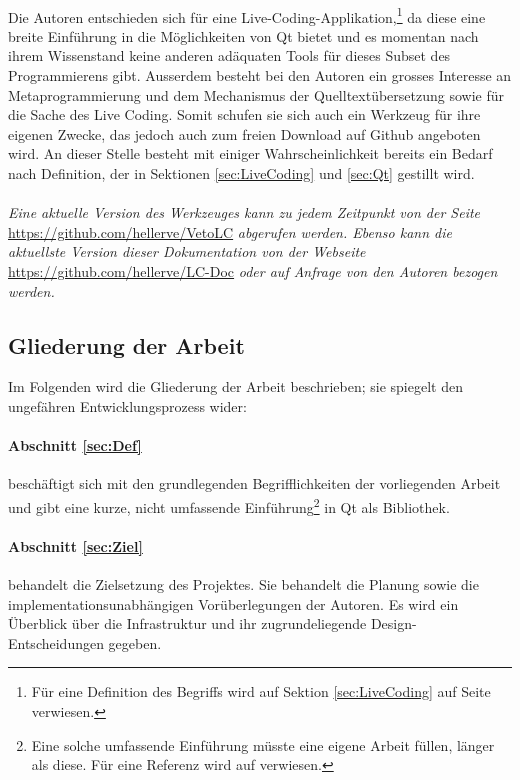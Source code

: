 \paragraph{}
	Die Autoren entschieden sich für eine Live-Coding-Applikation,\footnote{Für eine Definition des Begriffs wird auf Sektion \ref{sec:LiveCoding}
	auf Seite \pageref{sec:LiveCoding} verwiesen.} da diese eine breite Einführung in die Möglichkeiten von Qt bietet und es momentan
	nach ihrem Wissenstand keine anderen adäquaten Tools für dieses Subset des Programmierens gibt. Ausserdem besteht bei den Autoren
	ein grosses Interesse an Metaprogrammierung und dem Mechanismus der Quelltextübersetzung sowie für die Sache des Live Coding.
	Somit schufen sie sich auch ein Werkzeug für ihre eigenen Zwecke, das jedoch auch zum freien Download auf Github
	angeboten wird. An dieser Stelle besteht mit einiger Wahrscheinlichkeit bereits ein Bedarf nach Definition, der in Sektionen 
    \ref{sec:LiveCoding} und \ref{sec:Qt} gestillt wird.
\paragraph{}
    \textit{Eine aktuelle Version des Werkzeuges kann zu jedem Zeitpunkt von der Seite }\url{https://github.com/hellerve/VetoLC}\textit{ abgerufen werden.
    Ebenso kann die aktuellste Version dieser Dokumentation von der Webseite}\linebreak
    \url{https://github.com/hellerve/LC-Doc}\textit{ oder auf Anfrage von den Autoren bezogen werden.}

\newpage

\subsection{Gliederung der Arbeit}
	Im Folgenden wird die Gliederung der Arbeit beschrieben; sie spiegelt den ungefähren Entwicklungsprozess wider:
\paragraph{Abschnitt \ref{sec:Def}}
	beschäftigt sich mit den grundlegenden Begrifflichkeiten der vorliegenden Arbeit und gibt eine kurze, nicht umfassende Einführung\footnote{Eine solche 
    umfassende Einführung müsste eine eigene Arbeit füllen, länger als diese. Für eine Referenz wird auf \cite{EE11} verwiesen.} in Qt als Bibliothek.
\paragraph{Abschnitt \ref{sec:Ziel}}
	behandelt die Zielsetzung des Projektes. Sie behandelt die Planung sowie die implementationsunabhängigen Vorüberlegungen der Autoren.
	Es wird ein Überblick über die Infrastruktur und ihr zugrundeliegende Design-Entscheidungen gegeben.
